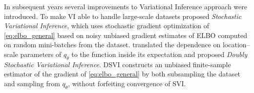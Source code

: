 \documentclass{article}
\begin{document}
In subsequent years several improvements to Variational Inference approach were introduced.
To make VI able to handle large-scale datasets \citet{hoffman_stochastic_2013} proposed
\emph{Stochastic Variational Inference}, which uses stochastic gradient optimization of
\eqref{eq:elbo_general} based on noisy unbiased gradient estimates of ELBO
computed on random mini-batches from the dataset. \citet{titsias_doubly_2014} translated
the dependence on location–scale parameters of $q_{\theta}$ to the function inside its
expectation and proposed \emph{Doubly Stochastic Variational Inference}. DSVI constructs
an unbiased finite-sample estimator of the gradient of \eqref{eq:elbo_general} by both
subsampling the dataset and sampling from $q_{\theta}$, without forfeiting convergence
of SVI.
\end{document}
